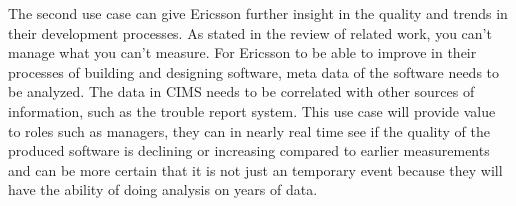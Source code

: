 The second use case can give Ericsson further insight in the quality and trends in their development processes. As stated in the review of related work, you can't manage what you can't measure. For Ericsson to be able to improve in their processes of building and designing software, meta data of the software needs to be analyzed. The data in CIMS needs to be correlated with other sources of information, such as the trouble report system. This use case will provide value to roles such as managers, they can in nearly real time see if the quality of the produced software is declining or increasing compared to earlier measurements and can be more certain that it is not just an temporary event because they will have the ability of doing analysis on years of data. 






